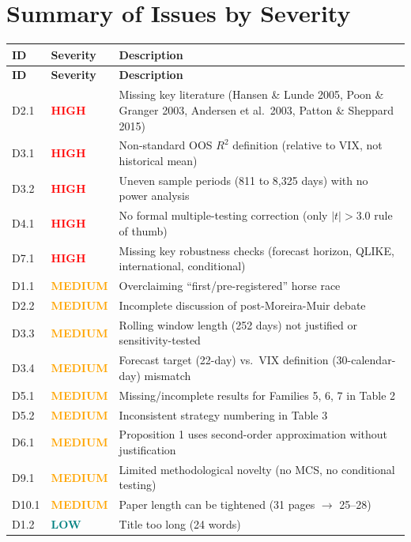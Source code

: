 \documentclass[12pt,a4paper]{article}
\newcommand{\HIGH}{\textcolor{red}{\textbf{HIGH}}}
\newcommand{\MEDIUM}{\textcolor{orange}{\textbf{MEDIUM}}}
\newcommand{\LOW}{\textcolor{teal}{\textbf{LOW}}}
\begin{document}
\section{Summary of Issues by Severity}
\label{sec:summary}

\begin{longtable}{@{}p{1cm}p{2cm}p{10cm}@{}}
\toprule
\textbf{ID} & \textbf{Severity} & \textbf{Description} \\
\midrule
\endfirsthead
\toprule
\textbf{ID} & \textbf{Severity} & \textbf{Description} \\
\midrule
\endhead
\bottomrule
\endlastfoot
D2.1 & \HIGH & Missing key literature (Hansen \& Lunde 2005, Poon \& Granger 2003, Andersen et al.\ 2003, Patton \& Sheppard 2015) \\
D3.1 & \HIGH & Non-standard OOS $R^2$ definition (relative to VIX, not historical mean) \\
D3.2 & \HIGH & Uneven sample periods (811 to 8,325 days) with no power analysis \\
D4.1 & \HIGH & No formal multiple-testing correction (only $|t|>3.0$ rule of thumb) \\
D7.1 & \HIGH & Missing key robustness checks (forecast horizon, QLIKE, international, conditional) \\
\midrule
D1.1 & \MEDIUM & Overclaiming ``first/pre-registered'' horse race \\
D2.2 & \MEDIUM & Incomplete discussion of post-Moreira-Muir debate \\
D3.3 & \MEDIUM & Rolling window length (252 days) not justified or sensitivity-tested \\
D3.4 & \MEDIUM & Forecast target (22-day) vs.\ VIX definition (30-calendar-day) mismatch \\
D5.1 & \MEDIUM & Missing/incomplete results for Families 5, 6, 7 in Table 2 \\
D5.2 & \MEDIUM & Inconsistent strategy numbering in Table 3 \\
D6.1 & \MEDIUM & Proposition 1 uses second-order approximation without justification \\
D9.1 & \MEDIUM & Limited methodological novelty (no MCS, no conditional testing) \\
D10.1 & \MEDIUM & Paper length can be tightened (31 pages $\rightarrow$ 25--28) \\
\midrule
D1.2 & \LOW & Title too long (24 words) \\

\end{longtable}
\end{document}
